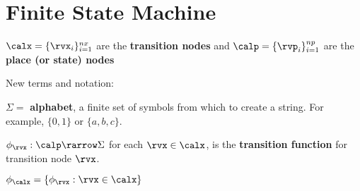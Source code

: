 \chapter{Finite State Machine}
\label{ch-finite-state}

$\calx =\{\rvx_i\}_{i=1}^{nx}$ are the {\bf transition nodes}
and 
$\calp =\{\rvp_i\}_{i=1}^{np}$ are the {\bf place (or state) nodes}

New terms and notation:

$\Sigma=$ {\bf alphabet}, a finite set of symbols
from which to create a string. For example,
$\{0, 1\}$ or $\{a, b, c\}$.


$\phi_\rvx:\calp\rarrow \Sigma$ for each
$\rvx\in \calx$,  is the 
{\bf transition function} for transition node $\rvx$.

$\phi_\calx =
\{\phi_\rvx: \rvx\in \calx\}$
